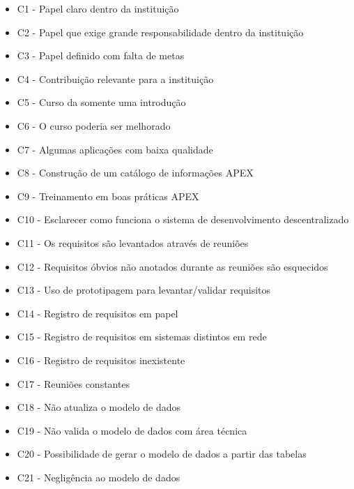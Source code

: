 \begin{itemize}
\item C1 - Papel claro dentro da instituição
\item C2 - Papel que exige grande responsabilidade dentro da instituição
\item C3 - Papel definido com falta de metas
\item C4 - Contribuição relevante para a instituição
\item C5 - Curso da somente uma introdução
\item C6 - O curso poderia ser melhorado
\item C7 - Algumas aplicações com baixa qualidade
\item C8 - Construção de um catálogo de informações APEX
\item C9 - Treinamento em boas práticas APEX
\item C10 - Esclarecer como funciona o sistema de desenvolvimento descentralizado
\item C11 - Os requisitos são levantados através de reuniões
\item C12 - Requisitos óbvios não anotados durante as reuniões são esquecidos
\item C13 - Uso de prototipagem para levantar/validar requisitos
\item C14 - Registro de requisitos em papel
\item C15 - Registro de requisitos em sistemas distintos em rede
\item C16 - Registro de requisitos inexistente
\item C17 - Reuniões constantes
\item C18 - Não atualiza o modelo de dados
\item C19 - Não valida o modelo de dados com área técnica
\item C20 - Possibilidade de gerar o modelo de dados a partir das tabelas
\item C21 - Negligência ao modelo de dados

\end{itemize}
